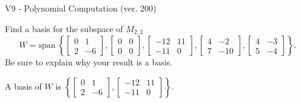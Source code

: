 \begin{exercise}
  \begin{exerciseTitle}V9 - Polynomial Computation (ver. 200)\end{exerciseTitle}
  \begin{exerciseStatement}
    Find a basis for the subspace of \(M_{2,2}\) 
\[W=\mathrm{span}\ \left\{\left[\begin{array}{cc}
0 & 1 \\
2 & -6
\end{array}\right] , \left[\begin{array}{cc}
0 & 0 \\
0 & 0
\end{array}\right] , \left[\begin{array}{cc}
-12 & 11 \\
-11 & 0
\end{array}\right] , \left[\begin{array}{cc}
4 & -2 \\
7 & -10
\end{array}\right] , \left[\begin{array}{cc}
4 & -3 \\
5 & -4
\end{array}\right]\right\}.\]
 Be sure to explain why your result is a basis.


  \end{exerciseStatement}
  \begin{exerciseAnswer}
   A basis of \(W\) is  \(\left\{\left[\begin{array}{cc}
0 & 1 \\
2 & -6
\end{array}\right] , \left[\begin{array}{cc}
-12 & 11 \\
-11 & 0
\end{array}\right]\right\}\).
  


  \end{exerciseAnswer}
\end{exercise}